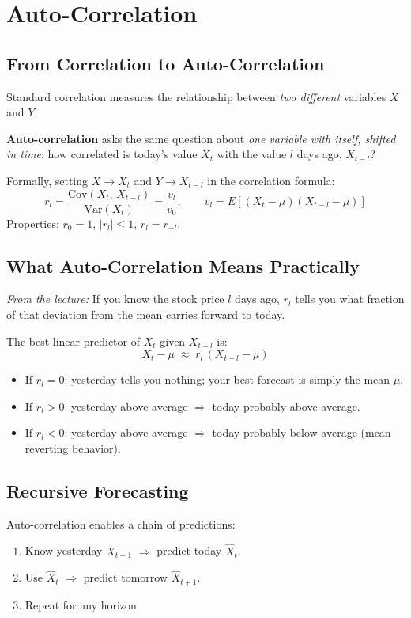 \documentclass[11pt]{article}
\begin{document}
\section{Auto-Correlation}

\subsection{From Correlation to Auto-Correlation}
Standard correlation measures the relationship between \emph{two different}
variables $X$ and $Y$.

\textbf{Auto-correlation} asks the same question about \emph{one variable with
itself, shifted in time}: how correlated is today's value $X_t$ with the value
$l$ days ago, $X_{t-l}$?

Formally, setting $X \to X_t$ and $Y \to X_{t-l}$ in the correlation formula:
\[
r_l = \frac{\text{Cov}(X_t,\, X_{t-l})}{\text{Var}(X_t)}
    = \frac{v_l}{v_0}, \qquad
v_l = E[(X_t - \mu)(X_{t-l} - \mu)]
\]
Properties: $r_0 = 1$,\; $|r_l| \leq 1$,\; $r_l = r_{-l}$.

\subsection{What Auto-Correlation Means Practically}

\textit{From the lecture:} If you know the stock price $l$ days ago, $r_l$ tells
you what fraction of that deviation from the mean carries forward to today.

The best linear predictor of $X_t$ given $X_{t-l}$ is:
\[
X_t - \mu \;\approx\; r_l\,(X_{t-l} - \mu)
\]

\begin{itemize}
    \item If $r_l = 0$: yesterday tells you nothing; your best forecast is simply
      the mean $\mu$.
    \item If $r_l > 0$: yesterday above average $\Rightarrow$ today probably above
      average.
    \item If $r_l < 0$: yesterday above average $\Rightarrow$ today probably below
      average (mean-reverting behavior).
\end{itemize}

\subsection{Recursive Forecasting}
Auto-correlation enables a chain of predictions:
\begin{enumerate}
    \item Know yesterday $X_{t-1}$ $\Rightarrow$ predict today $\hat{X}_t$.
    \item Use $\hat{X}_t$ $\Rightarrow$ predict tomorrow $\hat{X}_{t+1}$.
    \item Repeat for any horizon.
\end{enumerate}
\end{document}
